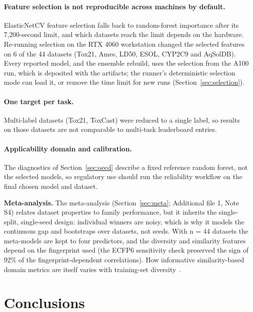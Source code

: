 \paragraph{Feature selection is not reproducible across machines by default.} ElasticNetCV feature selection falls back to random-forest importance after its 7,200-second limit, and which datasets reach the limit depends on the hardware. Re-running selection on the RTX 4060 workstation changed the selected features on 6 of the 44 datasets (Tox21, Ames, LD50, ESOL, CYP2C9 and AqSolDB). Every reported model, and the ensemble rebuild, uses the selection from the A100 run, which is deposited with the artifacts; the runner's deterministic selection mode can load it, or remove the time limit for new runs (Section~\ref{sec:selection}).

\paragraph{One target per task.} Multi-label datasets (Tox21, ToxCast) were reduced to a single label, so results on those datasets are not comparable to multi-task leaderboard entries.

\paragraph{Applicability domain and calibration.} The diagnostics of Section~\ref{sec:oecd} describe a fixed reference random forest, not the selected models, so regulatory use should run the reliability workflow on the final chosen model and dataset.

\textbf{Meta-analysis.} The meta-analysis (Section~\ref{sec:meta}; Additional file 1, Note S4) relates dataset properties to family performance, but it inherits the single-split, single-seed design: individual winners are noisy, which is why it models the continuous gap and bootstraps over datasets, not seeds. With n = 44 datasets the meta-models are kept to four predictors, and the diversity and similarity features depend on the fingerprint used (the ECFP6 sensitivity check preserved the sign of 92\% of the fingerprint-dependent correlations). How informative similarity-based domain metrics are itself varies with training-set diversity~\cite{sheridan2015relative}.

\section{Conclusions}\label{sec:conclusions}


